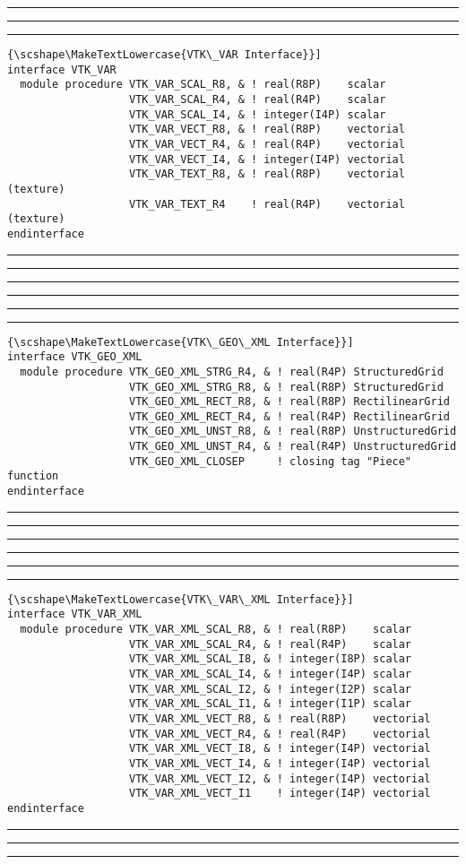 \documentclass[pagesize=pdftex,fontsize=10pt,paper=a4,oneside]{scrbook}
\DeclareRobustCommand{\MarginNote}[1]{\marginpar{%
\slshape\footnotesize%
\parindent=0pt\lineskip=0pt\lineskiplimit=0pt%
\tolerance=2000\hyphenpenalty=300\exhyphenpenalty=300%
\doublehyphendemerits=100000\finalhyphendemerits=\doublehyphendemerits%
\raggedright\hspace{0pt}#1}}
\newenvironment{boxred}[1]%
               {%
                \noindent\hspace*{-0.025\textwidth}%
                \color{Maroon}%
                \rule[-5.8pt]{0.6pt}{6pt}\hspace*{-0.6pt}\rule{1.05\textwidth}{0.6pt}\hspace*{-0.6pt}\rule[-5.8pt]{0.6pt}{6pt}%
                \color{black}%
                \vspace*{0.6pt}\MarginNote{\color{Maroon}{#1}}%
               }%
               {%
                \noindent\hspace*{-0.025\textwidth}%
                \color{Maroon}%
                \rule[0pt]{0.6pt}{6pt}\hspace*{-0.6pt}\rule{1.05\textwidth}{0.6pt}\hspace*{-0.6pt}\rule[0pt]{0.6pt}{6pt}%
                \color{black}%
                \vspace*{2mm}%
               }
\DeclareRobustCommand{\MaiuscolettoBS}[1]{\textls[80]{\scshape\MakeTextLowercase{#1}}}
\begin{document}
\label{interface:VTK_VAR}
 
\begin{boxred}{}
\begin{lstlisting}[style=variables,title=\color{Maroon}\MaiuscolettoBS{VTK\_VAR Interface}]
interface VTK_VAR
  module procedure VTK_VAR_SCAL_R8, & ! real(R8P)    scalar
                   VTK_VAR_SCAL_R4, & ! real(R4P)    scalar
                   VTK_VAR_SCAL_I4, & ! integer(I4P) scalar
                   VTK_VAR_VECT_R8, & ! real(R8P)    vectorial
                   VTK_VAR_VECT_R4, & ! real(R4P)    vectorial
                   VTK_VAR_VECT_I4, & ! integer(I4P) vectorial
                   VTK_VAR_TEXT_R8, & ! real(R8P)    vectorial (texture)
                   VTK_VAR_TEXT_R4    ! real(R4P)    vectorial (texture)
endinterface
\end{lstlisting}

\end{boxred}
 
\label{interface:VTK_GEO_XML}
 
\begin{boxred}{}
\begin{lstlisting}[style=variables,title=\color{Maroon}\MaiuscolettoBS{VTK\_GEO\_XML Interface}]
interface VTK_GEO_XML
  module procedure VTK_GEO_XML_STRG_R4, & ! real(R4P) StructuredGrid
                   VTK_GEO_XML_STRG_R8, & ! real(R8P) StructuredGrid
                   VTK_GEO_XML_RECT_R8, & ! real(R8P) RectilinearGrid
                   VTK_GEO_XML_RECT_R4, & ! real(R4P) RectilinearGrid
                   VTK_GEO_XML_UNST_R8, & ! real(R8P) UnstructuredGrid
                   VTK_GEO_XML_UNST_R4, & ! real(R4P) UnstructuredGrid
                   VTK_GEO_XML_CLOSEP     ! closing tag "Piece" function
endinterface
\end{lstlisting}

\end{boxred}
 
\label{interface:VTK_VAR_XML}
 
\begin{boxred}{}
\begin{lstlisting}[style=variables,title=\color{Maroon}\MaiuscolettoBS{VTK\_VAR\_XML Interface}]
interface VTK_VAR_XML
  module procedure VTK_VAR_XML_SCAL_R8, & ! real(R8P)    scalar
                   VTK_VAR_XML_SCAL_R4, & ! real(R4P)    scalar
                   VTK_VAR_XML_SCAL_I8, & ! integer(I8P) scalar
                   VTK_VAR_XML_SCAL_I4, & ! integer(I4P) scalar
                   VTK_VAR_XML_SCAL_I2, & ! integer(I2P) scalar
                   VTK_VAR_XML_SCAL_I1, & ! integer(I1P) scalar
                   VTK_VAR_XML_VECT_R8, & ! real(R8P)    vectorial
                   VTK_VAR_XML_VECT_R4, & ! real(R4P)    vectorial
                   VTK_VAR_XML_VECT_I8, & ! integer(I4P) vectorial
                   VTK_VAR_XML_VECT_I4, & ! integer(I4P) vectorial
                   VTK_VAR_XML_VECT_I2, & ! integer(I4P) vectorial
                   VTK_VAR_XML_VECT_I1    ! integer(I4P) vectorial
endinterface
\end{lstlisting}

\end{boxred}
 
\end{document}
